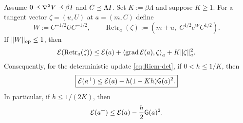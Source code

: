 \begin{lemma}
\label{lem:Riem-descent}
Assume $0\preceq\nabla^2V\preceq\beta I$ and $C\preceq\Lambda I$.  Set
$K:=\beta\Lambda$ and suppose $K\geq1$.  For a tangent vector $\zeta=(u,U)$ at
$a=(m,C)$ define
\[
    W:=C^{-1/2}UC^{-1/2},
    \qquad
    \operatorname{Retr}_a(\zeta)
    :=\left(m+u,\;C^{1/2}e^W C^{1/2}\right).
\]
If $\|W\|_{\mathrm{op}}\leq1$, then
\begin{equation}
\label{eq:Riem-retraction-smooth}
    \mathcal{E}(\operatorname{Retr}_a(\zeta))
    \leq
    \mathcal{E}(a)+\left\langle \operatorname{grad}\mathcal{E}(a),\zeta\right\rangle_a
    +K\|\zeta\|_a^2.
\end{equation}
Consequently, for the deterministic update \eqref{eq:Riem-det}, if
$0<h\leq1/K$, then
\begin{equation}
\label{eq:Riem-onestep}
    \boxed{
    \mathcal{E}(a^+)\leq
    \mathcal{E}(a)-h(1-Kh)\mathsf{G}(a)^2 .
    }
\end{equation}
In particular, if $h\leq1/(2K)$, then
\[
    \mathcal{E}(a^+)\leq\mathcal{E}(a)-\frac h2\mathsf{G}(a)^2.
\]
\end{lemma}

